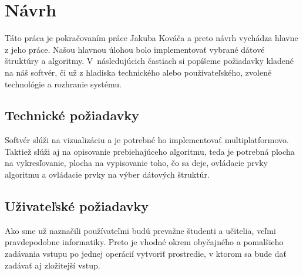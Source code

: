 
\section{Návrh}

Táto práca je pokračovaním práce Jakuba Kováča a preto návrh vychádza hlavne z 
jeho práce. Našou hlavnou úlohou bolo implementovať vybrané dátové štruktúry a 
algoritmy. V~následujúcich častiach si popíšeme požiadavky kladené na náš 
softvér, či už z hladiska technického alebo používateľského, zvolené 
technológie a rozhranie systému.

\subsection{Technické požiadavky}

Softvér slúži na vizualizáciu a je potrebné ho implementovať multiplatformovo.
Taktiež slúži aj na opisovanie prebiehajúceho algoritmu, teda 
je potrebná plocha na vykresľovanie, plocha na vypisovanie toho, čo sa deje, 
ovládacie prvky algoritmu a ovládacie prvky na výber dátových štruktúr.

\subsection{Uživateľské požiadavky}

Ako sme už naznačili používateľmi budú prevažne študenti a učitelia, veľmi 
pravdepodobne informatiky. Preto je vhodné okrem obyčajného a pomalšieho 
zadávania vstupu po jednej operácií vytvoriť prostredie, v ktorom sa bude dať 
zadávať aj zložitejší vstup.

